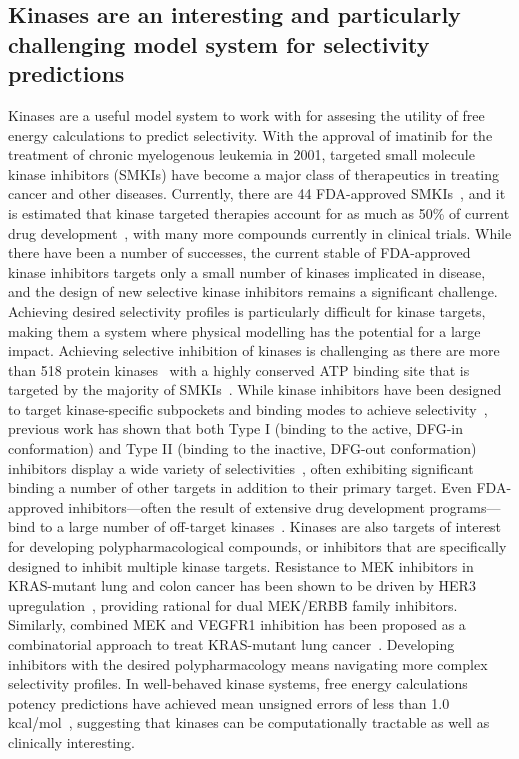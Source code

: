 \documentclass[phd,tocprelim]{cornell}
\begin{document}
\subsection{Kinases are an interesting and particularly challenging model system for selectivity predictions}
Kinases are a useful model system to work with for assesing the utility of free energy calculations to predict selectivity. With the approval of imatinib for the treatment of chronic myelogenous leukemia in 2001, targeted small molecule kinase inhibitors (SMKIs) have become a major class of therapeutics in treating cancer and other diseases. 
Currently, there are 44 FDA-approved SMKIs~\citep{fda-approved-kinase-inhibitors}, and it is estimated that kinase targeted therapies account for as much as 50\% of current drug development~\citep{Santos:Nat.Rev.DrugDiscov.:2016}, with many more compounds currently in clinical trials. 
While there have been a number of successes, the current stable of FDA-approved kinase inhibitors targets only a small number of kinases implicated in disease, and the design of new selective kinase inhibitors remains a significant challenge.
Achieving desired selectivity profiles is particularly difficult for kinase targets, making them a system where physical modelling has the potential for a large impact. Achieving selective inhibition of kinases is challenging as there are more than 518 protein kinases~\citep{Volkamer2015-jx,Manning2002-cw} with a highly conserved ATP binding site that is targeted by the majority of SMKIs~\citep{Wu2015-oq}.
While kinase inhibitors have been designed to target kinase-specific subpockets and binding modes to achieve selectivity~\citep{Cowan-Jacob2007-rn,Seeliger2007-jn,Huse2002-ml,Harrison2003-ct,Volkamer2016-sj,ChristmannFranck:2016gka}, previous work has shown that both Type I (binding to the active, DFG-in conformation) and Type II (binding to the inactive, DFG-out conformation) inhibitors display a wide variety of selectivities~\citep{Anastassiadis2011-sm,Davis:Nat.Biotechnol.:2011}, often exhibiting significant binding a number of other targets in addition to their primary target. 
Even FDA-approved inhibitors---often the result of extensive drug development programs---bind to a large number of off-target kinases~\citep{Klaeger2017-jr}. Kinases are also targets of interest for developing polypharmacological compounds, or inhibitors that are specifically designed to inhibit multiple kinase targets. Resistance to MEK inhibitors in KRAS-mutant lung and colon cancer has been shown to be driven by HER3 upregulation~\citep{Sun:2014kt}, providing rational for dual MEK/ERBB family inhibitors. Similarly, combined MEK and VEGFR1 inhibition has been proposed as a combinatorial approach to treat KRAS-mutant lung cancer~\citep{Manchado:2016fb}. Developing inhibitors with the desired polypharmacology means navigating more complex selectivity profiles. In well-behaved kinase systems, free energy calculations potency predictions have achieved mean unsigned errors of less than 1.0 kcal/mol~\citep{Wang:J.Am.Chem.Soc.:2015,Abel2017-gw}, suggesting that kinases can be computationally tractable as well as clinically interesting. 
\end{document}

